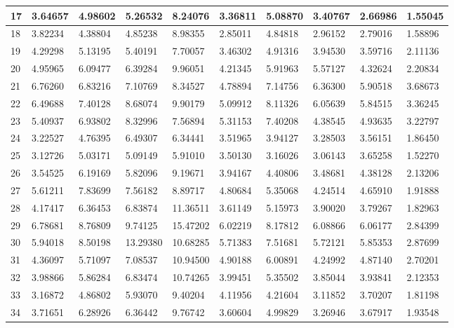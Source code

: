 \begin{table}[H]
{\begin{tabular}{|l|l|l|l|l|l|l|l|l|l|}
        17 & 3.64657 & 4.98602 & 5.26532 & 8.24076 & 3.36811 & 5.08870 & 3.40767 & 2.66986 & 1.55045 \\ \hline
        18 & 3.82234 & 4.38804 & 4.85238 & 8.98355 & 2.85011 & 4.84818 & 2.96152 & 2.79016 & 1.58896 \\ \hline
        19 & 4.29298 & 5.13195 & 5.40191 & 7.70057 & 3.46302 & 4.91316 & 3.94530 & 3.59716 & 2.11136 \\ \hline
        20 & 4.95965 & 6.09477 & 6.39284 & 9.96051 & 4.21345 & 5.91963 & 5.57127 & 4.32624 & 2.20834 \\ \hline
        21 & 6.76260 & 6.83216 & 7.10769 & 8.34527 & 4.78894 & 7.14756 & 6.36300 & 5.90518 & 3.68673 \\ \hline
        22 & 6.49688 & 7.40128 & 8.68074 & 9.90179 & 5.09912 & 8.11326 & 6.05639 & 5.84515 & 3.36245 \\ \hline
        23 & 5.40937 & 6.93802 & 8.32996 & 7.56894 & 5.31153 & 7.40208 & 4.38545 & 4.93635 & 3.22797 \\ \hline
        24 & 3.22527 & 4.76395 & 6.49307 & 6.34441 & 3.51965 & 3.94127 & 3.28503 & 3.56151 & 1.86450 \\ \hline
        25 & 3.12726 & 5.03171 & 5.09149 & 5.91010 & 3.50130 & 3.16026 & 3.06143 & 3.65258 & 1.52270 \\ \hline
        26 & 3.54525 & 6.19169 & 5.82096 & 9.19671 & 3.94167 & 4.40806 & 3.48681 & 4.38128 & 2.13206 \\ \hline
        27 & 5.61211 & 7.83699 & 7.56182 & 8.89717 & 4.80684 & 5.35068 & 4.24514 & 4.65910 & 1.91888 \\ \hline
        28 & 4.17417 & 6.36453 & 6.83874 & 11.36511 & 3.61149 & 5.15973 & 3.90020 & 3.79267 & 1.82963 \\ \hline
        29 & 6.78681 & 8.76809 & 9.74125 & 15.47202 & 6.02219 & 8.17812 & 6.08866 & 6.06177 & 2.84399 \\ \hline
        30 & 5.94018 & 8.50198 & 13.29380 & 10.68285 & 5.71383 & 7.51681 & 5.72121 & 5.85353 & 2.87699 \\ \hline
        31 & 4.36097 & 5.71097 & 7.08537 & 10.94500 & 4.90188 & 6.00891 & 4.24992 & 4.87140 & 2.70201 \\ \hline
        32 & 3.98866 & 5.86284 & 6.83474 & 10.74265 & 3.99451 & 5.35502 & 3.85044 & 3.93841 & 2.12353 \\ \hline
        33 & 3.16872 & 4.86802 & 5.93070 & 9.40204 & 4.11956 & 4.21604 & 3.11852 & 3.70207 & 1.81198 \\ \hline
        34 & 3.71651 & 6.28926 & 6.36442 & 9.76742 & 3.60604 & 4.99829 & 3.26946 & 3.67917 & 1.93548 \\ \hline

\end{tabular}}
\end{table}
